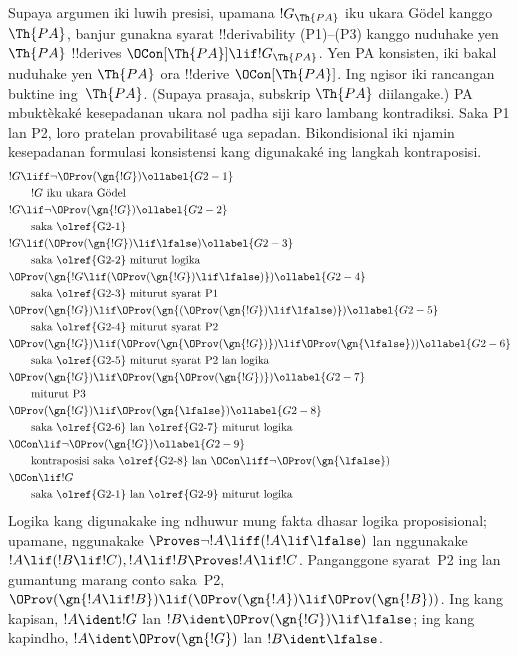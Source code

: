 \documentclass[../../../include/open-logic-section]{subfiles}
\begin{document}
Supaya argumen iki luwih presisi, upamana $!G_\Th{PA}$ iku ukara
G\"odel kanggo~$\Th{PA}$, banjur gunakna syarat !!{derivability}
(P1)--(P3) kanggo nuduhake yen $\Th{PA}$ !!{derive}s
$\OCon[\Th{PA}] \lif !G_\Th{PA}$. Yen PA konsisten, iki bakal nuduhake yen
$\Th{PA}$ ora !!{derive} $\OCon[\Th{PA}]$. Ing ngisor iki rancangan
buktine ing~$\Th{PA}$. (Supaya prasaja, subskrip $\Th{PA}$
diilangake.) PA mbuktèkaké kesepadanan ukara nol padha siji karo lambang kontradiksi. Saka P1 lan P2, loro pratelan provabilitasé uga sepadan. Bikondisional iki njamin kesepadanan formulasi konsistensi kang digunakaké ing langkah kontraposisi.
\begin{align}
& !G \liff \lnot \OProv(\gn{!G}) \ollabel{G2-1}\\
& \qquad\text{$!G$ iku ukara G\"odel}\notag \\
& !G \lif \lnot \OProv(\gn{!G}) \ollabel{G2-2}\\
  & \qquad\text{saka \olref{G2-1}} \notag\\
& !G \lif
  (\OProv(\gn{!G}) \lif \lfalse) \ollabel{G2-3}\\
  & \qquad\text{saka \olref{G2-2} miturut logika}\notag\\
& \OProv(\gn{
    !G \lif
    (\OProv(\gn{!G}) \lif \lfalse)
  }) \ollabel{G2-4}\\
  & \qquad\text{saka \olref{G2-3} miturut syarat P1} \notag\\
& \OProv(\gn{!G}) \lif
  \OProv(\gn{
    (\OProv(\gn{!G}) \lif \lfalse)
    }) \ollabel{G2-5}\\
  & \qquad\text{saka \olref{G2-4} miturut syarat P2} \notag\\
& \OProv(\gn{!G}) \lif (\OProv(\gn{\OProv(\gn{!G})}) \lif \OProv(\gn{\lfalse})) \ollabel{G2-6}\\
  & \qquad\text{saka \olref{G2-5} miturut syarat P2 lan logika} \notag\\
& \OProv(\gn{!G}) \lif 
  \OProv(\gn{\OProv(\gn{!G})}) \ollabel{G2-7}\\
   & \qquad\text{miturut P3} \notag\\
& \OProv(\gn{!G}) \lif \OProv(\gn{\lfalse}) \ollabel{G2-8}\\
  & \qquad \text{saka \olref{G2-6} lan \olref{G2-7} miturut logika}\notag\\
& \OCon \lif \lnot \OProv(\gn{!G}) \ollabel{G2-9}\\
  & \qquad\text{kontraposisi saka \olref{G2-8} lan $\OCon \liff \lnot \OProv(\gn{\lfalse})$}\notag \\
& \OCon \lif !G \notag\\
  & \qquad\text{saka \olref{G2-1} lan \olref{G2-9} miturut logika}\notag
\end{align}
Logika kang digunakake ing ndhuwur mung fakta dhasar logika
proposisional; upamane,  nggunakake
$\Proves \lnot!A \liff (!A\lif \lfalse)$ lan 
nggunakake $!A \lif (!B \lif !C), !A \lif !B \Proves !A \lif !C$.
Panganggone syarat~P2 ing  lan 
gumantung marang conto saka~P2,
$\OProv(\gn{!A \lif !B}) \lif
(\OProv(\gn{!A}) \lif \OProv(\gn{!B}))$. Ing kang kapisan,
$!A \ident !G$ lan $!B \ident \OProv(\gn{!G}) \lif \lfalse$;
ing kang kapindho, $!A \ident \OProv(\gn{!G})$ lan
$!B \ident \lfalse$.
\end{document}

